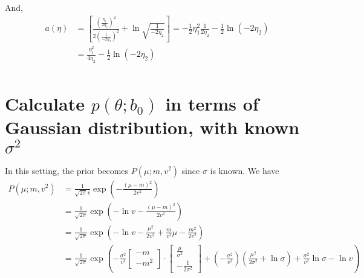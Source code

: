 \documentclass[12pt]{article}
\begin{document}
And,
\begin{align*}
  a(\eta) & =\left[\frac{\left(\frac{\eta_1}{2\eta_2}\right)^2}{2\left(\frac{1}{-2\eta_2}\right)^2}+\ln\sqrt{\frac{1}{-2\eta_2}}\right]=-\frac{1}{2}\eta_1^2\frac{1}{2\eta_2}-\frac{1}{2}\ln\left(-2\eta_2\right) \\
          & =\frac{\eta_1^2}{4\eta_2}-\frac{1}{2}\ln\left(-2\eta_2\right)                                                                                                                                         \\
\end{align*}

\newpage
\section*{Calculate $p(\theta;b_0)$ in terms of Gaussian distribution, with known $\sigma^2$}

In this setting, the prior becomes $P\left( \mu;m,v^2 \right)$ since $\sigma$ is known. We have
\begin{align*}
  P\left( \mu;m,v^2 \right) & =\frac{1}{\sqrt{2\pi}v}\exp\left( -\frac{(\mu-m)^2}{2v^2} \right)                                                                                                                                                                              \\
                            & =\frac{1}{\sqrt{2\pi}}\exp\left( -\ln v-\frac{(\mu-m)^2}{2v^2} \right)                                                                                                                                                                         \\
                            & =\frac{1}{\sqrt{2\pi}}\exp\left( -\ln v-\frac{\mu^2}{2v^2}+\frac{m}{v^2}\mu-\frac{m^2}{2v^2} \right)                                                                                                                                           \\
                            & =\frac{1}{\sqrt{2\pi}}\exp\left( -\frac{\sigma^2}{v^2}\begin{bmatrix}
      -m \\-m^2
    \end{bmatrix}\cdot\begin{bmatrix}
      \frac{\mu}{\sigma^2} \\-\frac{1}{2\sigma^2}
    \end{bmatrix}+\left( -\frac{\sigma^2}{v^2}\right)\left( \frac{\mu^2}{2\sigma^2}+\ln\sigma \right)+\frac{\sigma^2}{v^2}\ln\sigma-\ln v  \right)
\end{align*}
\end{document}
